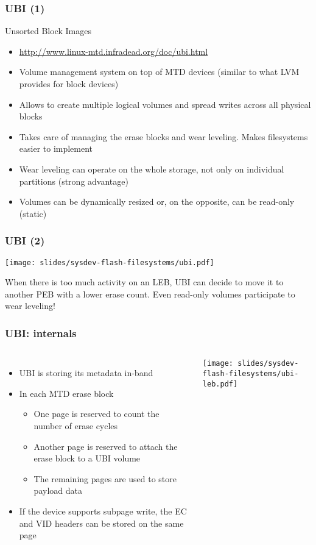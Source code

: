 \begin{frame}
  \frametitle{UBI (1)}
  Unsorted Block Images
  \begin{itemize}
  \item \url{http://www.linux-mtd.infradead.org/doc/ubi.html}
  \item Volume management system on top of MTD devices (similar to
    what LVM provides for block devices)
  \item Allows to create multiple logical volumes and spread writes
    across all physical blocks
  \item Takes care of managing the erase blocks and wear
    leveling. Makes filesystems easier to implement
  \item Wear leveling can operate on the whole storage,
    not only on individual partitions (strong advantage)
  \item Volumes can be dynamically resized or, on the opposite, can be
    read-only (static)
  \end{itemize}
\end{frame}

\begin{frame}
  \frametitle{UBI (2)}
  \begin{center}
    \texttt{[image: slides/sysdev-flash-filesystems/ubi.pdf]}
  \end{center}
  When there is too much activity on an LEB, UBI can decide to move it
  to another PEB with a lower erase count. Even read-only volumes
  participate to wear leveling!
\end{frame}

\begin{frame}
  \frametitle{UBI: internals}
  \begin{columns}
    \begin{itemize}
    \item UBI is storing its metadata in-band
    \item In each MTD erase block
    \begin{itemize}
      \item One page is reserved to count the number of erase cycles
      \item Another page is reserved to attach the erase block to a
        UBI volume
      \item The remaining pages are used to store payload data
      \end{itemize}
    \item If the device supports subpage write, the EC and VID headers
      can be stored on the same page
    \end{itemize}
    \texttt{[image: slides/sysdev-flash-filesystems/ubi-leb.pdf]}
  \end{columns}
\end{frame}

